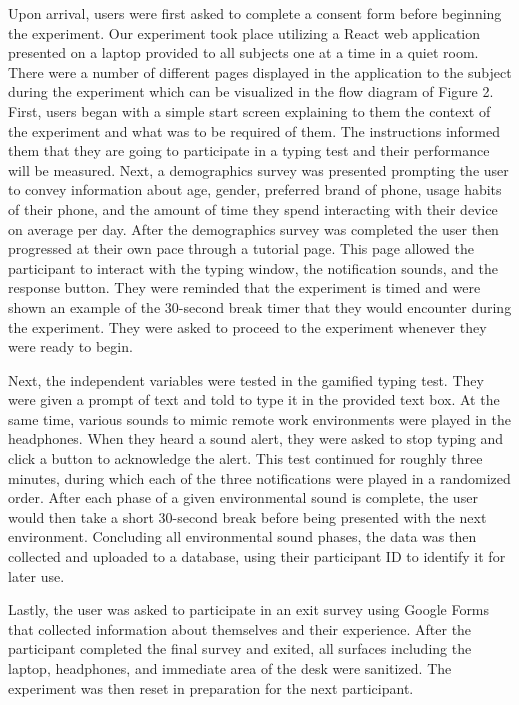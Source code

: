 \documentclass[manuscript,screen,review]{acmart}
\begin{document}
Upon arrival, users were first asked to complete a consent form before beginning the experiment. Our experiment took place utilizing a React web application presented on a laptop provided to all subjects one at a time in a quiet room. There were a number of different pages displayed in the application to the subject during the experiment which can be visualized in the flow diagram of Figure 2. First, users began with a simple start screen explaining to them the context of the experiment and what was to be required of them. The instructions informed them that they are going to participate in a typing test and their performance will be measured. Next, a demographics survey was presented prompting the user to convey information about age, gender, preferred brand of phone, usage habits of their phone, and the amount of time they spend interacting with their device on average per day. After the demographics survey was completed the user then progressed at their own pace through a tutorial page. This page allowed the participant to interact with the typing window, the notification sounds, and the response button. They were reminded that the experiment is timed and were shown an example of the 30-second break timer that they would encounter during the experiment. They were asked to proceed to the experiment whenever they were ready to begin. 

Next, the independent variables were tested in the gamified typing test. They were given a prompt of text and told to type it in the provided text box. At the same time, various sounds to mimic remote work environments were played in the headphones. When they heard a sound alert, they were asked to stop typing and click a button to acknowledge the alert. This test continued for roughly three minutes, during which each of the three notifications were played in a randomized order. After each phase of a given environmental sound is complete, the user would then take a short 30-second break before being presented with the next environment. Concluding all environmental sound phases, the data was then collected and uploaded to a database, using their participant ID to identify it for later use. 

Lastly, the user was asked to participate in an exit survey using Google Forms that collected information about themselves and their experience. After the participant completed the final survey and exited, all surfaces including the laptop, headphones, and immediate area of the desk were sanitized. The experiment was then reset in preparation for the next participant.
\end{document}
